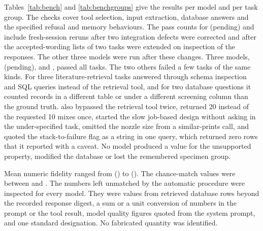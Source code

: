 \documentclass[preprint,12pt]{elsarticle}
\providecommand{\nbenchCxModel}{(pending)}
\begin{document}
\begin{table}[t]
\centering\small
\caption{Benchmark results under the final scoring rules after integration fixes and wording-rule revisions. Pass counts refer to applicable task checks. Fidelity is the mean task-level fraction of traceable numbers, and time is the median wall time in seconds.}
\label{tab:bench}
\resizebox{\textwidth}{!}{}
\end{table}

\begin{table}[t]
\centering\small
\caption{Tasks passed per task group and model under the final scoring rules.}
\label{tab:benchgroups}

\end{table}

Tables~\ref{tab:bench} and \ref{tab:benchgroups} give the results per model and per task group. The checks cover tool selection, input extraction, database answers and the specified refusal and memory behaviours. The pass counts for \nbenchCxModel{} and \nbenchCsModel{} include fresh-session reruns after two integration defects were corrected and after the accepted-wording lists of two tasks were extended on inspection of the responses. The other three models were run after these changes. Three models, \nbenchCxModel{}, \nbenchCsModel{} and \nbenchCvModel{}, passed all \nbenchCxN{} tasks. The two others failed a few tasks of the same kinds. For three literature-retrieval tasks \nbenchCwModel{} answered through schema inspection and SQL queries instead of the retrieval tool, and for two database questions it counted records in a different table or under a different screening column than the ground truth. \nbenchCuModel{} also bypassed the retrieval tool twice, returned 20 instead of the requested 10 mixes once, started the slow job-based design without asking in the under-specified task, omitted the nozzle size from a similar-prints call, and quoted the stack-to-failure flag as a string in one query, which returned zero rows that it reported with a caveat. No model produced a value for the unsupported property, modified the database or lost the remembered specimen group.

Mean numeric fidelity ranged from \nbenchCuFidelity{} (\nbenchCuModel{}) to \nbenchCsFidelity{} (\nbenchCsModel{}). The chance-match values were between \nbenchCxControl{} and \nbenchCsControl{}. The numbers left unmatched by the automatic procedure were inspected for every model. They were values from retrieved database rows beyond the recorded response digest, a sum or a unit conversion of numbers in the prompt or the tool result, model quality figures quoted from the system prompt, and one standard designation. No fabricated quantity was identified.
\end{document}
